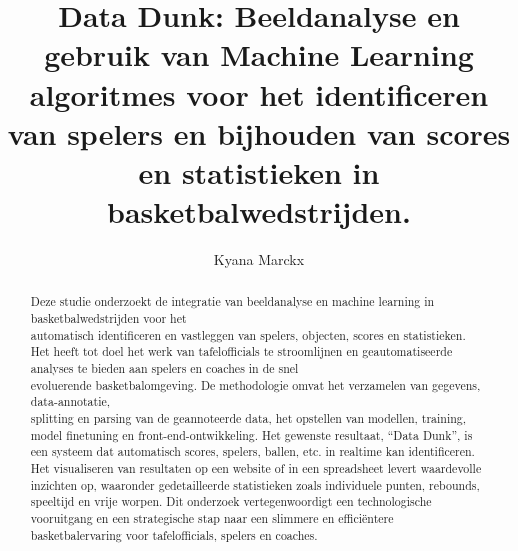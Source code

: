 \documentclass{hogent-article}
\title{Data Dunk: Beeldanalyse en gebruik van Machine Learning algoritmes voor het identificeren van spelers en bijhouden van scores en statistieken in \\basketbalwedstrijden.}
\author{Kyana Marckx}
\begin{document}
\begin{abstract}
  
  Deze studie onderzoekt de integratie van beeldanalyse en machine learning in basketbalwedstrijden voor het \\automatisch identificeren en vastleggen van spelers, objecten, scores en statistieken. Het heeft tot doel het werk van tafelofficials te stroomlijnen en geautomatiseerde analyses te bieden aan spelers en coaches in de snel \\evoluerende basketbalomgeving. De methodologie omvat het verzamelen van gegevens, data-annotatie, \\splitting en parsing van de geannoteerde data, het opstellen van modellen, training, model finetuning en front-end-ontwikkeling. Het gewenste resultaat, ``Data Dunk'', is een systeem dat  automatisch scores, spelers, ballen, etc. in realtime kan identificeren. Het visualiseren van resultaten op een website of in een spreadsheet levert waardevolle inzichten op, waaronder gedetailleerde statistieken zoals individuele punten, rebounds, speeltijd en vrije worpen. Dit onderzoek vertegenwoordigt een technologische vooruitgang en een strategische stap naar een slimmere en efficiëntere basketbalervaring voor tafelofficials, spelers en coaches.
\end{abstract}

\tableofcontents




%
%
\printbibliography[heading=bibintoc]
\end{document}
